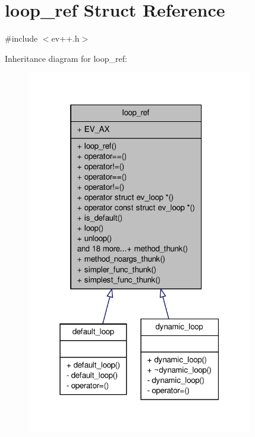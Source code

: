 \hypertarget{structev_1_1loop__ref}{\section{loop\-\_\-ref \-Struct \-Reference}
\label{structev_1_1loop__ref}
}


{\ttfamily \#include $<$ev++.\-h$>$}



\-Inheritance diagram for loop\-\_\-ref\-:
\nopagebreak
\begin{figure}[H]
\begin{center}
\leavevmode
\includegraphics[width=280pt]{structev_1_1loop__ref__inherit__graph}
\end{center}
\end{figure}


